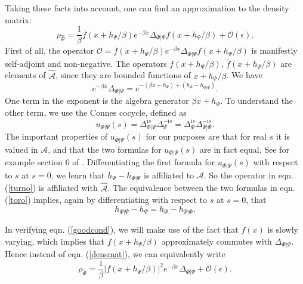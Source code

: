\documentclass[11pt,a4paper]{article}
\def\be{\begin{equation}}
\def\ee{\end{equation}}
\def\h{\widehat}
\def\O{{\mathcal O}}
\def\A{{\mathcal A}}
\def\h{\widehat}
\def\bar{\overline}
\def\i{{\mathrm i}}
\begin{document}
Taking these facts into account, one can find an approximation to the density matrix:
\be\label{densmat}\rho_{\h\Phi}=\frac{1}{\beta}\bar f(x+h_{\Psi}/\beta)e^{-\beta x}\Delta_{\Phi|\Psi}  f(x+h_{\Psi}/\beta) +\O(\epsilon). \ee
First of all, the operator $\O= \bar f(x+h_{\Psi}/\beta)e^{-\beta x}\Delta_{\Phi|\Psi}  f(x+h_{\Psi}/\beta)$ is manifestly self-adjoint and non-negative.
The operators   $f(x+h_{\Psi}/\beta)$, $\bar f(x+h_{\Psi}/\beta)$ are elements of $\h\A$, since they are bounded functions of $x+h_\Psi/\beta$.   We have
\be\label{turno} e^{-\beta x} \Delta_{\Phi|\Psi}= e^{-(\beta x+h_{\Psi})+(h_{\Psi}-h_{\Phi|\Psi})}.\ee
One term in the exponent is the algebra  generator $\beta x+h_{\Psi}$.
To understand the other term, we use the Connes cocycle, defined as
\be\label{toro} u_{\Phi|\Psi}(s)=\Delta_{\Phi|\Psi}^{\i s} \Delta_\Psi^{-\i s}= \Delta_\Phi^{\i s}\Delta_{\Psi|\Phi}^{-\i s}. \ee
The important properties of $u_{\Phi|\Psi}(s)$ for our purposes are that for real $s$ it is valued in $\A$, and that the two formulas for $u_{\Phi|\Psi}(s)$ are in fact
equal.   See for example section 6 of \cite{Lashkari}.   Differentiating the first formula for $u_{\Phi|\Psi}(s)$ with respect to $s$
at $s=0$, we learn that $h_\Psi-h_{\Phi|\Psi}$ is affiliated to $\A$.   
  So 
the operator  in eqn. (\ref{turno}) is affiliated with $\h\A$.  The equivalence between the two formulas in eqn. (\ref{toro}) implies,
again by differentiating with respect to $s$ at $s=0$, that
\be\label{longid} h_{\Phi|\Psi}-h_\Psi =h_\Phi-h_{\Psi|\Phi}. \ee

In verifying eqn. (\ref{goodcond}), 
we will make use of the fact that $f(x)$ is slowly varying, which implies that $f(x+h_{\Psi}/\beta)$ approximately commutes with
$\Delta_{\Phi|\Psi}$.    Hence instead of eqn. (\ref{densmat}), we can equivalently write
\be\label{densermat}\rho_{\h\Phi}=\frac{1}{\beta} |f(x+h_{\Psi}/\beta)|^2e^{-\beta x}\Delta_{\Phi|\Psi}  +\O(\epsilon). \ee
\end{document}

